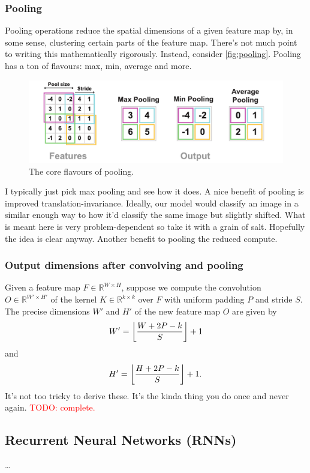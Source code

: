 \documentclass[11pt]{article}
\begin{document}
\subsubsection{Pooling}
Pooling operations reduce the spatial dimensions of a given feature map by, in some sense, clustering certain parts of the feature map. There's not much point to writing this mathematically rigorously. Instead, consider \autoref{fig:pooling}. Pooling has a ton of flavours: max, min, average and more.

\begin{figure}[ht]
    \centering
    \includegraphics[width=1\textwidth]{./figures/neural_nets/CNN_pooling.pdf}
    \caption{The core flavours of pooling.}
    \label{fig:pooling}
\end{figure}

\noindent I typically just pick max pooling and see how it does. A nice benefit of pooling is improved translation-invariance. Ideally, our model would classify an image in a similar enough way to how it'd classify the same image but slightly shifted. What is meant here is very problem-dependent so take it with a grain of salt. Hopefully the idea is clear anyway. Another benefit to pooling the reduced compute.

\subsubsection{Output dimensions after convolving and pooling}
Given a feature map $F\in\mathbb{R}^{W\times H}$, suppose we compute the convolution $O\in\mathbb{R}^{W'\times H'}$ of the kernel $K\in\mathbb{R}^{k\times k}$ over $F$ with uniform padding $P$ and stride $S$. The precise dimensions $W'$ and $H'$ of the new feature map $O$ are given by
$$
W'
=
\left\lfloor
\frac{W+2P-k}{S}
\right\rfloor
+1
$$
and
$$
H'
=
\left\lfloor
\frac{H+2P-k}{S}
\right\rfloor
+1.
$$
It's not too tricky to derive these. It's the kinda thing you do once and never again. \textcolor{red}{TODO: complete.}

\subsection{Recurrent Neural Networks (RNNs)}
\dots
\end{document}
